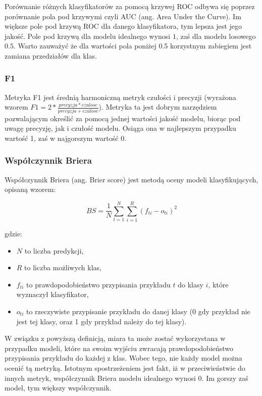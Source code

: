 \documentclass[a4paper, twoside, 11pt, openright]{article}
\begin{document}
Porównanie różnych klasyfikatorów za pomocą krzywej ROC odbywa się poprzez porównanie pola pod krzywymi czyli AUC (ang. Area Under the Curve). Im większe pole pod krzywą ROC dla danego klasyfikatora, tym lepsza jest jego jakość. Pole pod krzywą dla modelu idealnego wynosi $1$, zaś dla modelu losowego $0.5$. Warto zauważyć że dla wartości pola poniżej 0.5  korzystnym zabiegiem jest zamiana przedziałów dla klas.

\subsubsection{F1}

Metryka F1 jest średnią harmoniczną metryk czułości i precyzji (wyrażona wzorem $F1=2*\frac{precyzja*czulosc}{precyzja+czulosc}$). Metryka ta jest dobrym narzędziem pozwalającym określić za pomocą jednej wartości jakość modelu, biorąc pod uwagę precyzję, jak i czułość modelu. Osiąga ona w najlepszym przypadku wartość 1, zaś w najgorszym wartość 0. 

\subsubsection{Współczynnik Briera}

Współczynnik Briera (ang. Brier score)\cite{brier} jest metodą oceny modeli klasyfikujących, opisaną wzorem:

\begin{equation}
BS=\frac{1}{N} \sum_{t=1}^{N} \sum_{i=1}^{R}(f_{ti}-o_{ti})^2
\end{equation}

gdzie:
\begin{itemize}
\item $N$ to liczba predykcji,
\item $R$  to liczba możliwych klas,
\item $f_{ti}$ to prawdopodobieństwo przypisania przykładu $t$ do klasy $i$, które wyznaczył klasyfikator,
\item $o_{ti}$ to rzeczywiste przypisanie przykładu do danej klasy (0 gdy przykład nie jest tej klasy, oraz 1 gdy przykład należy do tej klasy).
\end{itemize}

W związku z powyższą definicją, miara ta może zostać wykorzystana w przypadku modeli, które na swoim wyjściu zwracają prawdopodobieństwo przypisania przykładu do każdej z klas. Wobec tego, nie każdy model można ocenić tą metryką. Istotnym spostrzeżeniem jest fakt, iż w przeciwieństwie do innych metryk, współczynnik Briera modelu idealnego wynosi $0$. Im gorszy zaś model, tym większy współczynnik.
\end{document}
